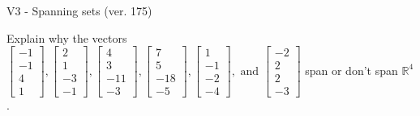 \begin{exercise}
  \begin{exerciseTitle}V3 - Spanning sets (ver. 175)\end{exerciseTitle}
  \begin{exerciseStatement}
    Explain why the vectors \(\left[\begin{array}{r}
-1 \\
-1 \\
4 \\
1
\end{array}\right] , \left[\begin{array}{r}
2 \\
1 \\
-3 \\
-1
\end{array}\right] , \left[\begin{array}{r}
4 \\
3 \\
-11 \\
-3
\end{array}\right] , \left[\begin{array}{r}
7 \\
5 \\
-18 \\
-5
\end{array}\right] , \left[\begin{array}{r}
1 \\
-1 \\
-2 \\
-4
\end{array}\right] , \text{ and } \left[\begin{array}{r}
-2 \\
2 \\
2 \\
-3
\end{array}\right]\) span or don't span \(\mathbb{R}^4\). 
	



\end{exerciseStatement}
\end{exercise}
